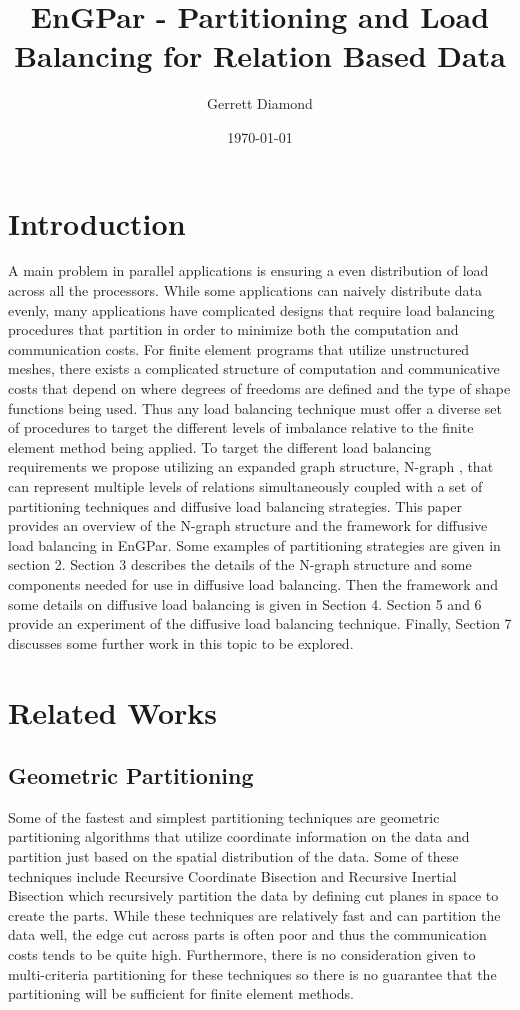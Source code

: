 \documentclass[a4paper]{article}
\title{EnGPar - Partitioning and Load Balancing for Relation Based Data}
\author{Gerrett Diamond}
\date{\today}
\begin{document}
\maketitle

\section{Introduction}
A main problem in parallel applications is ensuring a even distribution of load across all the processors. While some applications can naively distribute data evenly, many applications have complicated designs that require load balancing procedures that partition in order to minimize both the computation and communication costs. For finite element programs that utilize unstructured meshes, there exists a complicated structure of computation and communicative costs that depend on where degrees of freedoms are defined and the type of shape functions being used. Thus any load balancing technique must offer a diverse set of procedures to target the different levels of imbalance relative to the finite element method being applied. To target the different load balancing requirements we propose utilizing an expanded graph structure, N-graph \cite{EnGPar2015proposal}, that can represent multiple levels of relations simultaneously coupled with a set of partitioning techniques and diffusive load balancing strategies.
This paper provides an overview of the N-graph structure and the framework for diffusive load balancing in EnGPar. Some examples of partitioning strategies are given in section 2. Section 3 describes the details of the N-graph structure and some components needed for use in diffusive load balancing. Then the framework and some details on diffusive load balancing is given in Section 4. Section 5 and 6 provide an experiment of the diffusive load balancing technique. Finally, Section 7 discusses some further work in this topic to be explored.

\section{Related Works}
\subsection{Geometric Partitioning}
Some of the fastest and simplest partitioning techniques are geometric partitioning algorithms that utilize coordinate information on the data and partition just based on the spatial distribution of the data. Some of these techniques include Recursive Coordinate Bisection and Recursive Inertial Bisection \cite{chevalier2012load,TaylorRIB,williamsRIB} which recursively partition the data by defining cut planes in space to create the parts. While these techniques are relatively fast and can partition the data well, the edge cut across parts is often poor and thus the communication costs tends to be quite high. Furthermore, there is no consideration given to multi-criteria partitioning for these techniques so there is no guarantee that the partitioning will be sufficient for finite element methods.
\end{document}
